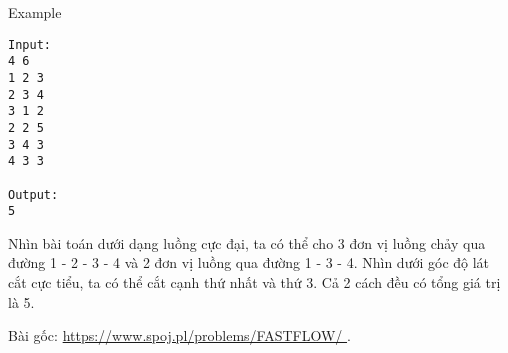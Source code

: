 Example
\begin{verbatim}
Input:
4 6
1 2 3
2 3 4
3 1 2
2 2 5
3 4 3
4 3 3

Output:
5
\end{verbatim}

   Nhìn bài toán dưới dạng luồng cực đại, ta có thể cho 3 đơn vị luồng chảy qua đường 1 - 2 - 3 - 4 và 2 đơn vị luồng qua đường 1 - 3 - 4. Nhìn dưới góc độ lát cắt cực tiểu, ta có thể cắt cạnh thứ nhất và thứ 3. Cả 2 cách đều có tổng giá trị là 5.  

   Bài gốc:   \href{https://www.spoj.pl/problems/FASTFLOW/}{    https://www.spoj.pl/problems/FASTFLOW/   }   .
